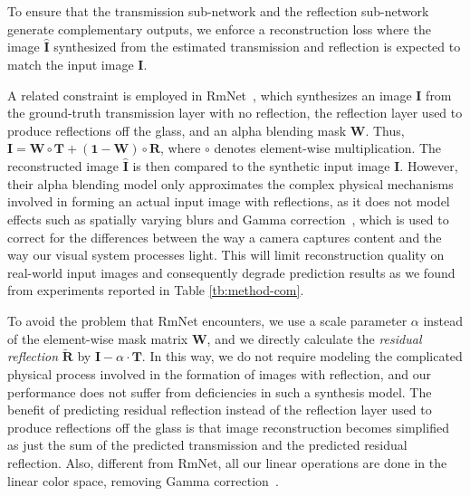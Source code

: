 \documentclass[10pt,twocolumn,letterpaper]{article}
\begin{document}
To ensure that the transmission sub-network and the reflection sub-network generate complementary outputs, we enforce a reconstruction loss where the image $\mathbf{\hat{I}}$ synthesized from the estimated transmission and reflection is expected to match the input image $\mathbf{I}$. 

A related constraint is employed in RmNet~\cite{wen2019single}, which synthesizes an image $\mathbf{I}$ from the 
ground-truth transmission layer with no reflection,
the reflection layer used to produce reflections off the glass, and an alpha blending mask $\mathbf{W}$. Thus, 
$\mathbf{I} = \mathbf{W} \circ \mathbf{T} + (\mathbf{1} - \mathbf{W}) \circ \mathbf{R}$,  
where $\circ$ denotes element-wise multiplication. 
The reconstructed image $\mathbf{\hat{I}}$ is then compared to the synthetic input image $\mathbf{I}$. However, their alpha blending model only approximates the complex physical mechanisms involved in forming an actual input image with reflections, as it does not model effects such as spatially varying blurs and Gamma correction~\cite{BULL201499}, which is used to correct for the differences between the way a camera captures content and the way our visual system processes light. This will limit reconstruction quality on real-world input images and consequently degrade prediction results as we found from experiments reported in Table \ref{tb:method-com}. 

To avoid the problem that RmNet encounters, we use a scale parameter $\alpha$ instead of the element-wise mask matrix $\mathbf{W}$, and we directly calculate the {\em residual reflection} $\mathbf{\widetilde{R}}$ by $\mathbf{I} - \alpha \cdot \mathbf{T}$. In this way, we do not require modeling the complicated physical process involved in the formation of images with reflection, and our performance does not suffer from deficiencies in such a synthesis model. The benefit of predicting residual reflection instead of the reflection layer used to produce reflections off the glass is that image reconstruction becomes simplified as just the sum of the predicted transmission and the predicted residual reflection.
Also, different from RmNet, all our linear operations are done in the linear color space, removing Gamma correction~\cite{BULL201499}.
\end{document}
